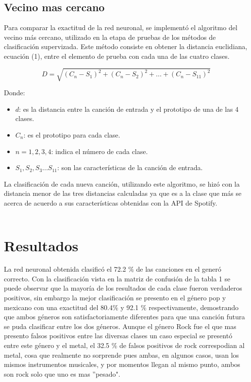 \documentclass[conference]{IEEEtran}
\begin{document}
\subsection{Vecino mas cercano}
Para comparar la exactitud de la red neuronal, se implementó el algoritmo del vecino m\'as cercano, utilizado en la etapa de pruebas de los métodos de clasificación supervizada. Este m\'etodo consiste en obtener la distancia euclidiana, ecuaci\'on (1), entre el elemento de prueba con cada una de las cuatro clases.

\begin{equation}
	D = \sqrt{ (C_n - S_{1} )^2 + (C_n - S_{2} )^2 + ... + (C_n - S_{11} )^2 }
\end{equation}

Donde:\\
\begin{itemize}
	\item $d$: es la distancia entre la canción de entrada y el prototipo de una de las 4 clases.
	\item $C_n$: es el prototipo para cada clase.
	\item $n = 1, 2, 3, 4$: indica el número de cada clase.
	\item $S_{1}, S_{2}, S_{3} ... S_{11}$: son las características de la canción de entrada. \\
\end{itemize}

La clasificación de cada nueva canción, utilizando este algoritmo, se hizó con la distancia menor de las tres distancias calculadas ya que es a la clase que más se acerca de acuerdo a sus características obtenidas con la API de Spotify.\\\\

\section{Resultados}

La red neuronal obtenida clasificó el 72.2 \% de las canciones en el generó correcto. Con la clasificación vista en la matriz de confusión de la tabla 1 se puede observar que la mayoría de los resultados de cada clase fueron verdaderos positivos, sin embargo la mejor clasificación se presento en el género pop y mexicano con una exactitud del 80.4\% y 92.1 \% respectivamente, demostrando que  ambos géneros son satisfactoriamente diferentes para que una canción futura se puda clasificar entre los dos géneros. Aunque el género Rock fue el que mas presento falsos positivos entre las diversas clases un caso especial se presentó entre este género y el metal, el 32.5 \% de falsos positivos de rock correspodian al metal, cosa que realmente no sorprende pues ambas, en algunos casos, usan los mismos instrumentos musicales, y por momentos llegan al mismo punto, ambos son rock solo que uno es mas ''pesado". 
 
\end{document}
